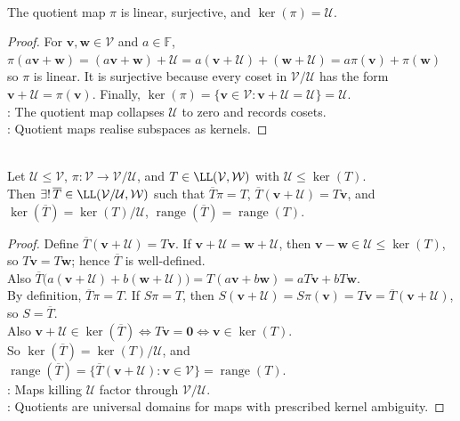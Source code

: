\begin{proposition} \label{prop:quotient-map-properties} \\
The quotient map $\pi$ is linear, surjective, and $\ker(\pi) = \mathcal{U}$.
\begin{proof}
For $\mathbf{v},\mathbf{w}\in\mathcal{V}$ and $a\in\mathbb{F}$, $\pi(a\mathbf{v}+\mathbf{w})=(a\mathbf{v}+\mathbf{w})+\mathcal{U} =a(\mathbf{v}+\mathcal{U})+(\mathbf{w}+\mathcal{U}) =a\pi(\mathbf{v})+\pi(\mathbf{w})$ so $\pi$ is linear. It is surjective because every coset in $\mathcal{V}/\mathcal{U}$ has the form $\mathbf{v}+\mathcal{U}=\pi(\mathbf{v})$. Finally, $\ker(\pi)=\{\mathbf{v}\in\mathcal{V}:\mathbf{v}+\mathcal{U}=\mathcal{U}\}=\mathcal{U}$.\\
: The quotient map collapses $\mathcal{U}$ to zero and records cosets.\\
: Quotient maps realise subspaces as kernels.
\end{proof}
\end{proposition}

\begin{theorem} \label{thm:quotient-universal-property} \label{thm:quotient-factorisation-through-projection} \\
Let $\mathcal{U}\leq\mathcal{V}$, $\pi:\mathcal{V}\to\mathcal{V}/\mathcal{U}$, and $T\in\LL(\mathcal{V},\mathcal{W})$ with $\mathcal{U}\leq\ker(T)$.\\
Then $\exists!\,\overline{T}\in\LL(\mathcal{V}/\mathcal{U},\mathcal{W})
$ such that $\overline{T}\pi=T$, $\overline{T}(\mathbf{v}+\mathcal{U})=T\mathbf{v}$, and $\ker(\overline{T})=\ker(T)/\mathcal{U}$, $\operatorname{range}(\overline{T})=\operatorname{range}(T)$.
\begin{proof}
Define $\overline{T}(\mathbf{v}+\mathcal{U})=T\mathbf{v}$. If $\mathbf{v}+\mathcal{U}=\mathbf{w}+\mathcal{U}$, then $\mathbf{v}-\mathbf{w}\in\mathcal{U}\leq\ker(T)$, so $T\mathbf{v}=T\mathbf{w}$; hence $\overline{T}$ is well-defined.\\
Also $\overline{T}\big(a(\mathbf{v}+\mathcal{U})+b(\mathbf{w}+\mathcal{U})\big) =T(a\mathbf{v}+b\mathbf{w}) =aT\mathbf{v}+bT\mathbf{w}$.\\
By definition, $\overline{T}\pi=T$. If $S\pi=T$, then $S(\mathbf{v}+\mathcal{U})=S\pi(\mathbf{v})=T\mathbf{v}=\overline{T}(\mathbf{v}+\mathcal{U})$, so $S=\overline{T}$.\\
Also $\mathbf{v}+\mathcal{U}\in\ker(\overline{T}) \Longleftrightarrow T\mathbf{v}=\mathbf{0} \Longleftrightarrow \mathbf{v}\in\ker(T)$.\\
So $\ker(\overline{T})=\ker(T)/\mathcal{U}$, and $\operatorname{range}(\overline{T})=\{\overline{T}(\mathbf{v}+\mathcal{U}):\mathbf{v}\in\mathcal{V}\}=\operatorname{range}(T)$.\\
: Maps killing $\mathcal{U}$ factor through $\mathcal{V}/\mathcal{U}$.\\
: Quotients are universal domains for maps with prescribed kernel ambiguity.
\end{proof}
\end{theorem}

